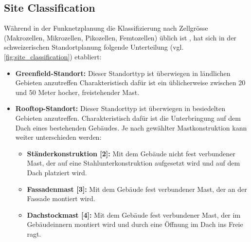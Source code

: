 \subsection{Site Classification}
\begin{German}
    Während in der Funknetzplanung die Klassifizierung nach Zellgrösse (Makrozellen, Mikrozellen, Pikozellen, Femtozellen) üblich ist \cite{jiangCellularCommunicationNetworks2024}, hat sich in der schweizerischen Standortplanung folgende Unterteilung (vgl. \ref{fig:site_classification}) etabliert: 

    \begin{itemize}
        \item \textbf{Greenfield-Standort:} Dieser Standorttyp ist überwiegen in ländlichen Gebieten anzutreffen Charakteristisch dafür ist ein üblicherweise zwischen 20 und 50 Meter hocher, freistehender Mast.
        \item \textbf{Rooftop-Standort:} Dieser Standorttyp ist überwiegen in besiedelten Gebieten anzutreffen. Charakteristisch dafür ist die Unterbringung auf dem Dach eines bestehenden Gebäudes. Je nach gewählter Mastkonstruktion kann weiter unterschieden werden:
        \begin{itemize}
            \item \textbf{Ständerkonstruktion [2]:} Mit dem Gebäude nicht fest verbundener Mast, der auf eine Stahlunterkonstruktion aufgesetzt wird und auf dem Dach platziert wird.
            \item \textbf{Fassadenmast [3]:} Mit dem Gebäude fest verbundener Mast, der an der Fassade montiert wird. 
            \item \textbf{Dachstockmast [4]:} Mit dem Gebäude fest verbundener Mast, der im Gebäudeinnern montiert wird und durch eine Öffnung im Dach ins Freie ragt.
        \end{itemize}
    \end{itemize}
\end{German}

